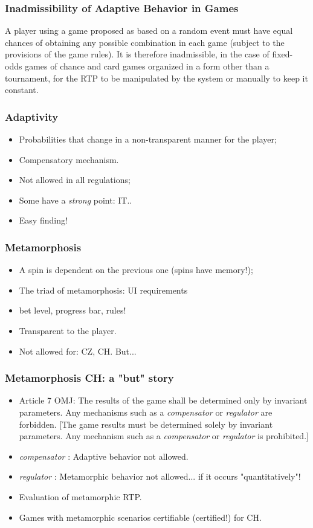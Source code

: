 \documentclass{beamer}
\begin{document}
\begin{frame}
\frametitle{Inadmissibility of Adaptive Behavior in Games}
A player using a game proposed as based on a random event must have equal chances of obtaining any possible combination in each game (subject to the provisions of the game rules). It is therefore inadmissible, in the case of fixed-odds games of chance and card games organized in a form other than a tournament, for the RTP to be manipulated by the system or manually to keep it constant.
\end{frame}

\begin{frame}
\frametitle{Adaptivity}
\begin{itemize}
\item<1-> Probabilities that change in a non-transparent manner for the player;
\item<2-> Compensatory mechanism.
\item<3-> Not allowed in all regulations;
\item<4-> Some have a \emph{strong} point: IT..
\item<5-> Easy finding!
\end{itemize}
\end{frame}

\begin{frame}
\frametitle{Metamorphosis}
\begin{itemize}
\item<1-> A spin is dependent on the previous one (spins have memory!);
\item<2-> The triad of metamorphosis: UI requirements
\item<3-> bet level, progress bar, rules!
\item<4-> Transparent to the player.
\item<5-> Not allowed for: CZ, CH. But...
\end{itemize}
\end{frame}

\begin{frame}
\frametitle{Metamorphosis CH: a "but" story}
\begin{itemize}
\item<1-> Article 7 OMJ: The results of the game shall be determined only by invariant parameters. Any mechanisms such as a \emph{compensator} or \emph{regulator} are forbidden. [The game results must be determined solely by invariant parameters. Any mechanism such as a \emph{compensator} or \emph{regulator} is prohibited.]
\item<2-> \emph{compensator} : Adaptive behavior not allowed.
\item<3-> \emph{regulator} : Metamorphic behavior not allowed... if it occurs "quantitatively"!
\item<4-> Evaluation of metamorphic RTP.
\item<5-> Games with metamorphic scenarios certifiable (certified!) for CH.
\end{itemize}
\end{frame}
\end{document}

